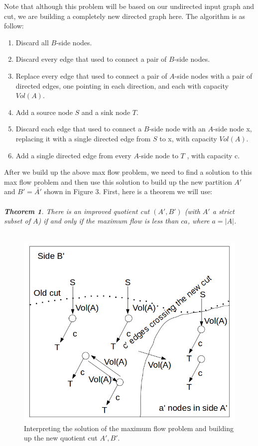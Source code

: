 \documentclass[12pt]{article}
\begin{document}
Note that although this problem will be based on our undirected input graph and cut, we are building a completely new directed graph here. The algorithm is as follow:
\begin{enumerate}
\item Discard all $B$-side nodes.
\item Discard every edge that used to connect a pair of $B$-side nodes.
\item Replace every edge that used to connect a pair of $A$-side nodes with a pair
of directed edges, one pointing in each direction, and each with capacity $Vol(A)$.
\item Add a source node $S$ and a sink node $T$.
\item Discard each edge that used to connect a $B$-side node with an $A$-side node
x, replacing it with a single directed edge from $S$ to x, with capacity $Vol(A)$.
\item Add a single directed edge from every $A$-side node to $T$ , with capacity c.
\end{enumerate}
After we build up the above max flow problem, we need to find a solution to this max flow problem and then use this solution to build up the new partition $A'$ and $B'=\bar{A'}$ shown in Figure 3. First, here is a theorem we will use:\\\\
\textit{\textbf{Theorem 1}. There is an improved quotient cut $(A',B')$ (with $A'$ a strict subset
of $A$) if and only if the maximum flow is less than $ca$, where $a=|A|$.}\\\\
\begin{figure}[h]
\begin{center}
\includegraphics[scale=0.4]{MQI2.png}  
\caption{Interpreting the solution of the maximum flow problem and building up the new quotient cut $A',B'$.}
\end{center}
\end{figure}
\end{document}

